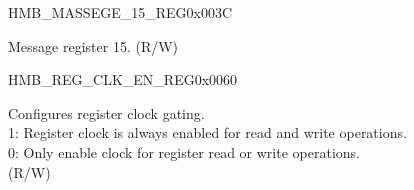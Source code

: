 \begin{register}{H}{MB\_MASSEGE\_15\_REG}{0x003C}\label{regdesc:MBMESSAGE15REG}
%
\regnewline%
\begin{regdesc}\begin{reglist}
\label{fielddesc:MBMESSAGE15}\item [MB\_MASSEGE\_15] Message register 15. (R/W)
\end{reglist}\end{regdesc}
\end{register}


\begin{register}{H}{MB\_REG\_CLK\_EN\_REG}{0x0060}\label{regdesc:MBREGCLKENREG}
%
%
\regnewline%
\begin{regdesc}\begin{reglist}
\label{fielddesc:MBREGCLKEN}\item [MB\_REG\_CLK\_EN] Configures register clock gating.\\
1: Register clock is always enabled for read and write operations.\\
0: Only enable clock for register read or write operations. \\(R/W)
\end{reglist}\end{regdesc}
\end{register}



